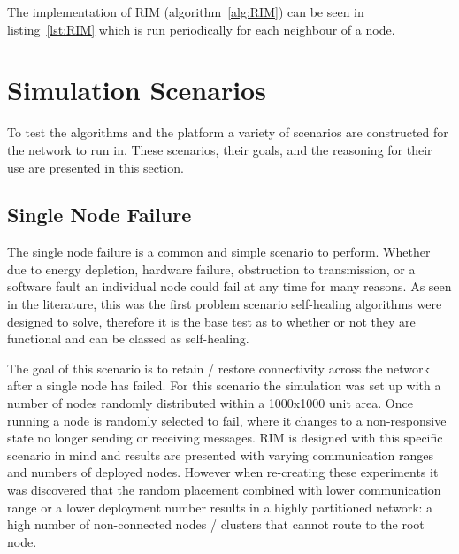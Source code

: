\documentclass[authoryearcitations]{UoYCSproject}
\begin{document}
The implementation of RIM (algorithm~\ref{alg:RIM}) can be seen in listing~\ref{lst:RIM} which is run periodically for each neighbour of a node.


\section{Simulation Scenarios}
\label{sec:scenarios}

To test the algorithms and the platform a variety of scenarios are constructed for the network to run in. These scenarios, their goals, and the reasoning for their use are presented in this section.

\subsection{Single Node Failure}

The single node failure is a common and simple scenario to perform. Whether due to energy depletion, hardware failure, obstruction to transmission, or a software fault an individual node could fail at any time for many reasons. As seen in the literature, this was the first problem scenario self-healing algorithms were designed to solve, therefore it is the base test as to whether or not they are functional and can be classed as self-healing.

The goal of this scenario is to retain / restore connectivity across the network after a single node has failed. For this scenario the simulation was set up with a number of nodes randomly distributed within a 1000x1000 unit area. Once running a node is randomly selected to fail, where it changes to a non-responsive state no longer sending or receiving messages. RIM is designed with this specific scenario in mind and results are presented with varying communication ranges and numbers of deployed nodes. However when re-creating these experiments it was discovered that the random placement combined with lower communication range or a lower deployment number results in a highly partitioned network: a high number of non-connected nodes / clusters that cannot route to the root node.
\end{document}
